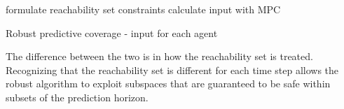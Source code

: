 \documentclass{article}
\begin{document}
\vspace{2mm}

\begin{algorithm}[H]
\SetAlgoLined
	
	formulate reachability set constraints\;
	calculate input with MPC\;
	
 \caption{Robust predictive coverage  - input for each agent}
\end{algorithm}

\vspace{5mm}

The difference between the two is in how the reachability set is treated. Recognizing that the reachability set is different for each time step allows the robust algorithm to exploit subspaces that are guaranteed to be safe within subsets of the prediction horizon.



\end{document}
